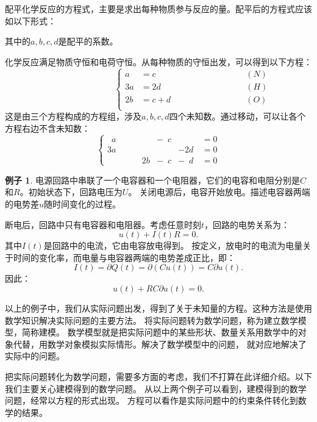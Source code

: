 \documentclass[12pt,UTF8]{ctexbook}
\theoremstyle{definition}
\newtheorem{ex}{例子}[section]
\theoremstyle{plain}
\begin{document}
配平化学反应的方程式，主要是求出每种物质参与反应的量。配平后的方程式应该如以下形式：

\begin{center}
\end{center}

其中的$a, b, c, d$是配平的系数。

化学反应满足物质守恒和电荷守恒。从每种物质的守恒出发，可以得到以下方程：
$$ \qquad \qquad \qquad \qquad \left\{
    \begin{array}{rll}
a &= c &\qquad \qquad \qquad \qquad (N) \\
3a &= 2d &\qquad \qquad \qquad \qquad (H) \\
2b &= c + d &\qquad \qquad \qquad \qquad (O) \\
\end{array}
\right. 
$$
这是由三个方程构成的方程组，涉及$a, b, c, d$四个未知数。通过移动，可以让各个方程右边不含未知数：
$$\left\{
    \begin{array}{rrrrl}
\phantom{0}a &\phantom{+ 0b} &- \phantom{0}c &\phantom{+ 0b}\, &= 0  \\
3a &\phantom{+ 0b} &\phantom{- 0c} &- 2d\, &= 0  \\
\phantom{0a} &\phantom{+ }\quad 2b &- \phantom{0}c &- \phantom{0}d\, &= 0  
\end{array}
\right. 
$$

\begin{ex}
    电源回路中串联了一个电容器和一个电阻器，它们的电容和电阻分别是$C$和$R$。初始状态下，回路电压为$U$。
    关闭电源后，电容开始放电。描述电容器两端的电势差$u$随时间变化的过程。
\end{ex}

断电后，回路中只有电容器和电阻器。考虑任意时刻$t$，回路的电势关系为：
$$ u(t) + I(t)R = 0.$$
其中$I(t)$是回路中的电流，它由电容放电得到。
按定义，放电时的电流为电量关于时间的变化率，而电量与电容器两端的电势差成正比，即：
$$ I(t) = \partial Q(t) = \partial (Cu(t)) = C\partial  u(t).$$
因此：
$$ u(t) + RC\partial  u(t) = 0.$$

以上的例子中，我们从实际问题出发，得到了关于未知量的方程。这种方法是使用数学知识解决实际问题的主要方法。
将实际问题转为数学问题，称为建立数学模型，简称建模。
数学模型就是把实际问题中的某些形状、数量关系用数学中的对象代替，用数学对象模拟实际情形。解决了数学模型中的问题，
就对应地解决了实际中的问题。

把实际问题转化为数学问题，需要多方面的考虑，我们不打算在此详细介绍。以下我们主要关心建模得到的数学问题。
从以上两个例子可以看到，建模得到的数学问题，经常以方程的形式出现。
方程可以看作是实际问题中的约束条件转化到数学的结果。
\end{document}
